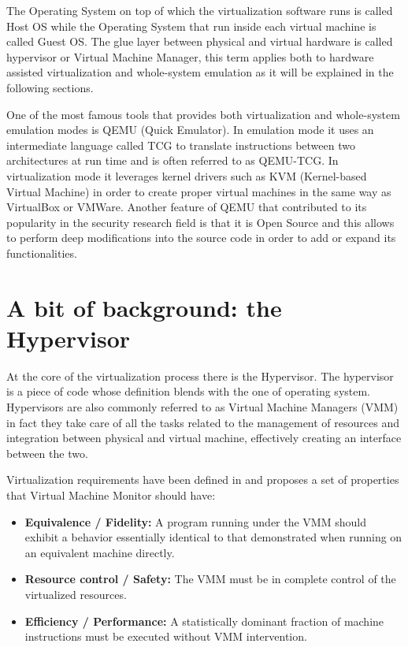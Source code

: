 The Operating System on top of which the virtualization software runs is called Host OS while the Operating System that run inside each virtual machine is called Guest OS. The glue layer between physical and virtual hardware is called hypervisor or Virtual Machine Manager, this term applies both to hardware assisted virtualization and whole-system emulation as it will be explained in the following sections.

One of the most famous tools that provides both virtualization and whole-system emulation modes is QEMU (Quick Emulator). In emulation mode it uses an intermediate language called TCG to translate instructions between two architectures at run time and is often referred to as QEMU-TCG. In virtualization mode it leverages kernel drivers such as KVM (Kernel-based Virtual Machine) in order to create proper virtual machines in the same way as VirtualBox or VMWare. Another feature of QEMU that contributed to its popularity in the security research field is that it is Open Source and this allows to perform deep modifications into the source code in order to add or expand its functionalities.

\section{A bit of background: the Hypervisor}

At the core of the virtualization process there is the Hypervisor. The hypervisor is a piece of code whose definition blends with the one of operating system. Hypervisors are also commonly referred to as Virtual Machine Managers (VMM) in fact they take care of all the tasks related to the management of resources and integration between physical and virtual machine, effectively creating an interface between the two.

Virtualization requirements have been defined in \cite{virtreq} and proposes a set of properties that Virtual Machine Monitor should have:

\begin{itemize}
    \item \textbf{Equivalence / Fidelity:} A program running under the VMM should exhibit a behavior essentially identical to that demonstrated when running on an equivalent machine directly.
    \item \textbf{Resource control / Safety:} The VMM must be in complete control of the virtualized resources.
    \item \textbf{Efficiency / Performance:} A statistically dominant fraction of machine instructions must be executed without VMM intervention.
\end{itemize}

